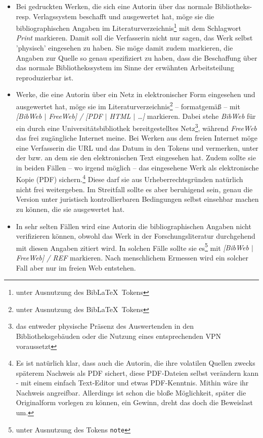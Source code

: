 \begin{itemize}
  \item Bei gedruckten Werken, die sich eine Autorin über das normale Bibliotheks- resp. Verlagssystem beschafft und  ausgewertet hat, möge sie die bibliographischen Angaben im Literaturverzeichnis\footnote{unter Ausnutzung des Bib\LaTeX\ Tokens } mit dem Schlagwort \emph{Print} markieren. Damit soll die Verfasserin nicht nur sagen, das Werk selbst 'physisch' eingesehen zu haben. Sie möge damit zudem markieren, die Angaben zur Quelle so genau spezifiziert zu haben, dass die Beschaffung über das normale Bibliothekssystem im Sinne der erwähnten Arbeitsteilung reproduzierbar ist.
  \item Werke, die eine Autorin über ein Netz in elektronischer Form eingesehen und ausgewertet hat, möge sie im Literaturverzeichnis\footnote{unter Ausnutzung des Bib\LaTeX\ Tokens }  -- formatgemäß -- mit \emph{[BibWeb $|$ FreeWeb] / [PDF $|$ HTML $|$ \ldots]} markieren. Dabei stehe \emph{BibWeb} für ein durch eine Universitätsbibliothek bereitgestelltes Netz\footnote{das entweder physische Präsenz des Auswertenden in den Bibliotheksgebäuden oder die Nutzung eines entsprechenden VPN voraussetzt}, während \emph{FreeWeb} das frei zugängliche Internet meine. Bei Werken aus dem freien Internet möge eine Verfasserin die URL und das Datum in den Tokens  und  vermerken, unter der bzw. an dem sie den elektronischen Text eingesehen hat. Zudem sollte sie in beiden Fällen -- wo irgend möglich -- das eingesehene Werk als elektronische Kopie (PDF) sichern.\footnote{Es ist natürlich klar, dass auch die Autorin, die ihre volatilen Quellen zwecks späterem Nachweis als PDF sichert, diese PDF-Dateien selbst verändern kann - mit einem einfach Text-Editor und etwas PDF-Kenntnis. Mithin wäre ihr Nachweis angreifbar. Allerdings ist schon die bloße Möglichkeit, später die Originalform vorlegen zu können, ein Gewinn, dreht das doch die Beweislast um.} Diese darf sie aus Urheberrechtsgründen natürlich nicht frei weitergeben. Im Streitfall sollte es aber beruhigend sein, genau die Version unter juristisch kontrollierbaren Bedingungen selbst einsehbar machen zu können, die sie ausgewertet hat.
  \item In sehr selten Fällen wird eine Autorin die bibliographischen Angaben nicht verifizieren können, obwohl das Werk in der Forschungsliteratur durchgehend mit diesen Angaben zitiert wird. In solchen Fälle sollte sie es\footnote{unter Ausnutzung des Tokens \texttt{note}} mit \emph{[BibWeb $|$ FreeWeb] / REF} markieren. Nach menschlichem Ermessen wird ein solcher Fall aber nur im freien Web entstehen.
\end{itemize}

